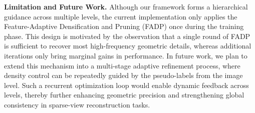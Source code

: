 \textbf{Limitation and Future Work.}
Although our framework forms a hierarchical guidance across multiple levels, the current implementation only applies the Feature-Adaptive Densification and Pruning (FADP) once during the training phase. 
This design is motivated by the observation that a single round of FADP is sufficient to recover most high-frequency geometric details, whereas additional iterations only bring marginal gains in performance.
In future work, we plan to extend this mechanism into a multi-stage adaptive refinement process, where density control can be repeatedly guided by the pseudo-labels from the image level. 
Such a recurrent optimization loop would enable dynamic feedback across levels, thereby further enhancing geometric precision and strengthening global consistency in sparse-view reconstruction tasks.